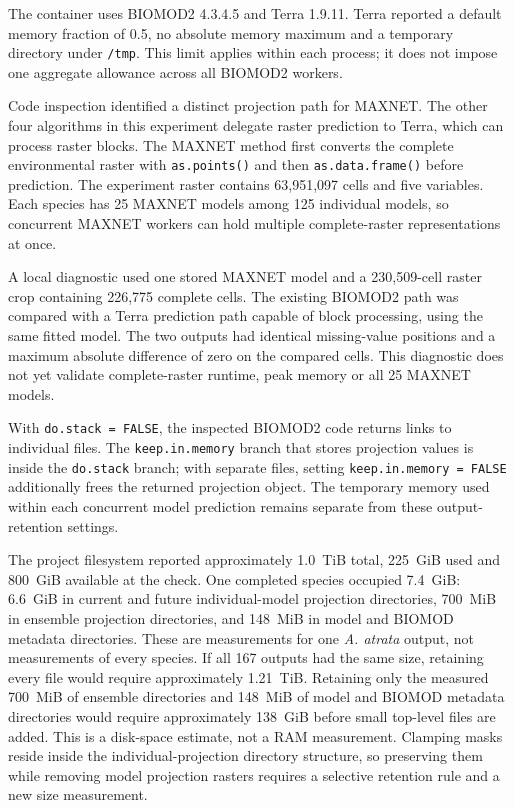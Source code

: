 The container uses BIOMOD2 4.3.4.5 and Terra 1.9.11. Terra reported a default memory fraction of 0.5, no absolute memory maximum and a temporary directory under \texttt{/tmp}. This limit applies within each process; it does not impose one aggregate allowance across all BIOMOD2 workers.

Code inspection identified a distinct projection path for MAXNET. The other four algorithms in this experiment delegate raster prediction to Terra, which can process raster blocks. The MAXNET method first converts the complete environmental raster with \texttt{as.points()} and then \texttt{as.data.frame()} before prediction. The experiment raster contains 63,951,097 cells and five variables. Each species has 25 MAXNET models among 125 individual models, so concurrent MAXNET workers can hold multiple complete-raster representations at once.

A local diagnostic used one stored MAXNET model and a 230,509-cell raster crop containing 226,775 complete cells. The existing BIOMOD2 path was compared with a Terra prediction path capable of block processing, using the same fitted model. The two outputs had identical missing-value positions and a maximum absolute difference of zero on the compared cells. This diagnostic does not yet validate complete-raster runtime, peak memory or all 25 MAXNET models.

With \texttt{do.stack = FALSE}, the inspected BIOMOD2 code returns links to individual files. The \texttt{keep.in.memory} branch that stores projection values is inside the \texttt{do.stack} branch; with separate files, setting \texttt{keep.in.memory = FALSE} additionally frees the returned projection object. The temporary memory used within each concurrent model prediction remains separate from these output-retention settings.

The project filesystem reported approximately 1.0~TiB total, 225~GiB used and 800~GiB available at the check. One completed species occupied 7.4~GiB: 6.6~GiB in current and future individual-model projection directories, 700~MiB in ensemble projection directories, and 148~MiB in model and BIOMOD metadata directories. These are measurements for one \emph{A. atrata} output, not measurements of every species. If all 167 outputs had the same size, retaining every file would require approximately 1.21~TiB. Retaining only the measured 700~MiB of ensemble directories and 148~MiB of model and BIOMOD metadata directories would require approximately 138~GiB before small top-level files are added. This is a disk-space estimate, not a RAM measurement. Clamping masks reside inside the individual-projection directory structure, so preserving them while removing model projection rasters requires a selective retention rule and a new size measurement.

